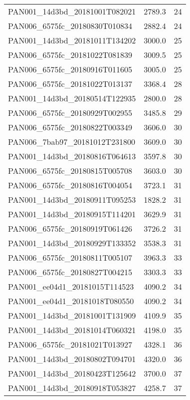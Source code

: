 \begin{tabular}{lrr}
PAN001\_14d3bd\_20181001T082021 &     2789.3 &       24 \\
PAN006\_6575fc\_20180830T010834 &     2882.4 &       24 \\
PAN001\_14d3bd\_20181011T134202 &     3000.0 &       25 \\
PAN006\_6575fc\_20181022T081839 &     3009.5 &       25 \\
PAN006\_6575fc\_20180916T011605 &     3005.0 &       25 \\
PAN006\_6575fc\_20181022T013137 &     3368.4 &       28 \\
PAN001\_14d3bd\_20180514T122935 &     2800.0 &       28 \\
PAN006\_6575fc\_20180929T002955 &     3485.8 &       29 \\
PAN006\_6575fc\_20180822T003349 &     3606.0 &       30 \\
PAN006\_7bab97\_20181012T231800 &     3609.0 &       30 \\
PAN001\_14d3bd\_20180816T064613 &     3597.8 &       30 \\
PAN006\_6575fc\_20180815T005708 &     3603.0 &       30 \\
PAN006\_6575fc\_20180816T004054 &     3723.1 &       31 \\
PAN001\_14d3bd\_20180911T095253 &     1828.2 &       31 \\
PAN001\_14d3bd\_20180915T114201 &     3629.9 &       31 \\
PAN006\_6575fc\_20180919T061426 &     3726.2 &       31 \\
PAN001\_14d3bd\_20180929T133352 &     3538.3 &       31 \\
PAN006\_6575fc\_20180811T005107 &     3963.3 &       33 \\
PAN006\_6575fc\_20180827T004215 &     3303.3 &       33 \\
PAN001\_ee04d1\_20181015T114523 &     4090.2 &       34 \\
PAN001\_ee04d1\_20181018T080550 &     4090.2 &       34 \\
PAN001\_14d3bd\_20181001T131909 &     4109.9 &       35 \\
PAN001\_14d3bd\_20181014T060321 &     4198.0 &       35 \\
PAN006\_6575fc\_20181021T013927 &     4328.1 &       36 \\
PAN001\_14d3bd\_20180802T094701 &     4320.0 &       36 \\
PAN001\_14d3bd\_20180423T125642 &     3700.0 &       37 \\
PAN001\_14d3bd\_20180918T053827 &     4258.7 &       37 \\

\end{tabular}
